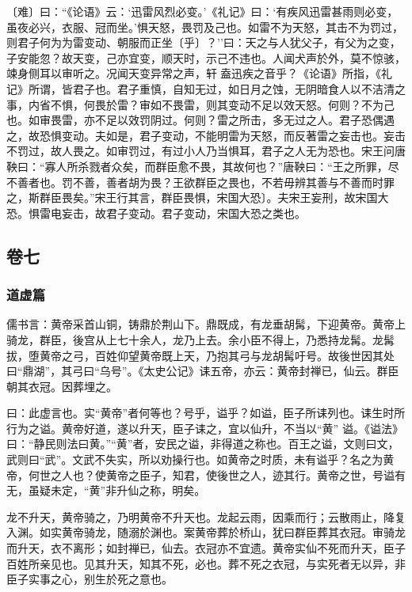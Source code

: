 \documentclass[]{article}
\begin{document}
〔难〕曰：``《论语》云：`迅雷风烈必变。'《礼记》曰：`有疾风迅雷甚雨则必变，虽夜必兴，衣服、冠而坐。'惧天怒，畏罚及己也。如雷不为天怒，其击不为罚过，则君子何为为雷变动、朝服而正坐〔乎〕？''曰：天之与人犹父子，有父为之变，子安能忽？故天变，己亦宜变，顺天时，示己不违也。人闻犬声於外，莫不惊骇，竦身侧耳以审听之。况闻天变异常之声，轩盍迅疾之音乎？《论语》所指，《礼记》所谓，皆君子也。君子重慎，自知无过，如日月之蚀，无阴暗食人以不洁清之事，内省不惧，何畏於雷？审如不畏雷，则其变动不足以效天怒。何则？不为己也。如审畏雷，亦不足以效罚阴过。何则？雷之所击，多无过之人。君子恐偶遇之，故恐惧变动。夫如是，君子变动，不能明雷为天怒，而反著雷之妄击也。妄击不罚过，故人畏之。如审罚过，有过小人乃当惧耳，君子之人无为恐也。宋王问唐鞅曰：``寡人所杀戮者众矣，而群臣愈不畏，其故何也？''唐鞅曰：``王之所罪，尽不善者也。罚不善，善者胡为畏？王欲群臣之畏也，不若毋辨其善与不善而时罪之，斯群臣畏矣。''宋王行其言，群臣畏惧，宋国大恐〕。夫宋王妄刑，故宋国大恐。惧雷电妄击，故君子变动。君子变动，宋国大恐之类也。

\hypertarget{header-n256}{%
\subsection{卷七}\label{header-n256}}

\hypertarget{header-n257}{%
\subsubsection{道虚篇}\label{header-n257}}

儒书言：黄帝采首山铜，铸鼎於荆山下。鼎既成，有龙垂胡髯，下迎黄帝。黄帝上骑龙，群臣，後宫从上七十余人，龙乃上去。余小臣不得上，乃悉持龙髯。龙髯拔，堕黄帝之弓，百姓仰望黄帝既上天，乃抱其弓与龙胡髯吁号。故後世因其处曰``鼎湖''，其弓曰``乌号''。《太史公记》诔五帝，亦云：黄帝封禅已，仙云。群臣朝其衣冠。因葬埋之。

曰：此虚言也。实``黄帝''者何等也？号乎，谥乎？如谥，臣子所诔列也。诔生时所行为之谥。黄帝好道，遂以升天，臣子诔之，宜以仙升，不当以``黄''
谥。《谥法》曰：``静民则法曰黄。''``黄''者，安民之谥，非得道之称也。百王之谥，文则曰文，武则曰``武''。文武不失实，所以劝操行也。如黄帝之时质，未有谥乎？名之为黄帝，何世之人也？使黄帝之臣子，知君，使後世之人，迹其行。黄帝之世，号谥有无，虽疑未定，``黄''非升仙之称，明矣。

龙不升天，黄帝骑之，乃明黄帝不升天也。龙起云雨，因乘而行；云散雨止，降复入渊。如实黄帝骑龙，随溺於渊也。案黄帝葬於桥山，犹曰群臣葬其衣冠。审骑龙而升天，衣不离形；如封禅已，仙去。衣冠亦不宜遗。黄帝实仙不死而升天，臣子百姓所亲见也。见其升天，知其不死，必也。葬不死之衣冠，与实死者无以异，非臣子实事之心，别生於死之意也。
\end{document}
